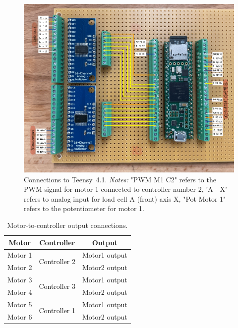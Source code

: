 \begin{figure}[H]
    \centering
    \includegraphics[width=\textwidth]{figures/elec_connections.png}
    \caption{Connections to Teensy~4.1. \textit{Notes: } "PWM M1 C2" refers to the PWM signal for motor 1 connected to controller number 2, 
    'A - X' refers to analog input for load cell A (front) axis X, "Pot Motor 1" refers to the potentiometer for motor 1.}
    \label{fig:connections_teensy}
\end{figure}

\begin{table}[h]
    \centering
    \begin{tabular}{|c|c|c|}
        \hline
        \textbf{Motor} & \textbf{Controller} & \textbf{Output} \\ \hline
        Motor 1 & \multirow{2}{*}{Controller 2} & Motor1 output \\ \cline{1-1} \cline{3-3}
        Motor 2 &  & Motor2 output \\ \hline
        Motor 3 & \multirow{2}{*}{Controller 3} & Motor1 output \\ \cline{1-1} \cline{3-3}
        Motor 4 &  & Motor2 output \\ \hline
        Motor 5 & \multirow{2}{*}{Controller 1} & Motor1 output \\ \cline{1-1} \cline{3-3}
        Motor 6 &  & Motor2 output \\ \hline
    \end{tabular}
    \caption{Motor-to-controller output connections.}
\end{table}